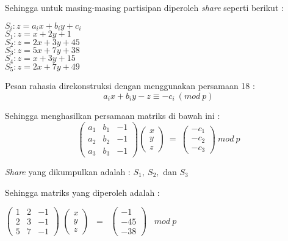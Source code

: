 \documentclass[a4paper,twoside]{article}
\begin{document}
\begin{enumerate}
\begin{itemize}
Sehingga untuk masing-masing partisipan diperoleh \textit{share} seperti berikut : 
\begin{center}
$S_{i} : z = a_{i}x + b_{i}y + c_{i}$ \\
$S_{1} : z = x + 2y + 1$ \\
$S_{2} : z = 2x + 3y + 45$ \\
$S_{3} : z = 5x + 7y + 38$ \\
$S_{4} : z = x + 3y + 15$ \\
$S_{5} : z = 2x + 7y + 49$ \\
\end{center}
\vspace{10pt}

Pesan rahasia direkonstruksi dengan menggunakan persamaan 18 :
\begin{equation}
a_{i}x+b_{i}y-z \equiv -c_{i} \ (mod \ p)
\end{equation}

Sehingga menghasilkan persamaan matriks di bawah ini :
\begin{equation}
\left(
\begin{array}{ccc}
 a_{1} & b_{1} & -1 \\ 
 a_{2} & b_{2} & -1 \\
 a_{3} & b_{3} & -1
\end{array}
\right)
\left(
\begin{array}{c}
 x \\ 
 y \\
 z
\end{array}
\right) \ = \ 
\left(
\begin{array}{c}
 -c_{1} \\ 
 -c_{2} \\
 -c_{3}
\end{array}
\right) \ mod \ p
\end{equation}

\textit{Share} yang dikumpulkan adalah : $S_{1}, \ S_{2},$ dan $S_{3}$

Sehingga matriks yang diperoleh adalah : 
\begin{center}
$\left(
\begin{array}{ccc}
 1 & 2 & -1 \\ 
 2 & 3 & -1 \\
 5 & 7 & -1
\end{array}
\right)$
$\left(
\begin{array}{c}
 x \\ 
 y \\
 z
\end{array}
\right)$ \ = \ 
$\left(
\begin{array}{c}
 -1 \\ 
 -45 \\
 -38
\end{array}
\right)$ \ $mod \ p$
\end{center}
\vspace{10pt}


\end{itemize}
\end{enumerate}
\end{document}
